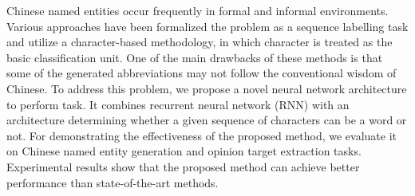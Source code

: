 Chinese named entities occur frequently in formal and informal environments. Various approaches have been formalized the problem as a sequence labelling task and utilize a character-based methodology, in which character is treated as the basic classification unit. One of the main drawbacks of these methods is that some of the generated abbreviations may not follow the conventional wisdom of Chinese. To address this problem, we propose a novel neural network architecture to perform task. It combines recurrent neural network (RNN) with an architecture determining whether a given sequence of characters can be a word or not. For demonstrating the effectiveness of the proposed method, we evaluate it on Chinese named entity generation and opinion target extraction tasks. Experimental results show that the proposed method can achieve better performance than state-of-the-art methods.
